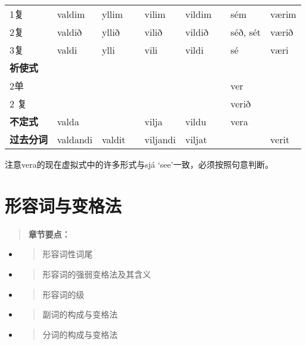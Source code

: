 \begin{longtable}{lllllllll}
  1复            & valdim   & yllim              &  & vilim      & vildim &  & sém      & værim      \\
  2复            & valdið   & yllið              &  & vilið      & vildið &  & séð, sét & værið      \\
  3复            & valdi    & ylli               &  & vili       & vildi  &  & sé       & væri       \\
  \textbf{祈使式}  &          &                    &  &            &        &  &          &            \\
  2单            &          &                    &  &            &        &  & ver      &            \\
  2 复           &          &                    &  &            &        &  & verið    &            \\
  \textbf{不定式}  & valda    &                    &  & vilja      & vildu  &  & vera     &            \\
  \textbf{过去分词} & valdandi & valdit             &  & viljandi   & viljat &  &          &
  verit                                                                                             \\
\end{longtable}

注意vera的现在虚拟式中的许多形式与sjá `see‌'一致，必须按照句意判断。

\chapter{形容词与变格法}\label{形容词与变格法}

\begin{quote}
  \textbf{章节要点：}
\end{quote}

\begin{itemize}
  \item
        \begin{quote}
          形容词性词尾
        \end{quote}
  \item
        \begin{quote}
          形容词的强弱变格法及其含义
        \end{quote}
  \item
        \begin{quote}
          形容词的级
        \end{quote}
  \item
        \begin{quote}
          副词的构成与变格法
        \end{quote}
  \item
        \begin{quote}
          分词的构成与变格法
        \end{quote}
\end{itemize}

